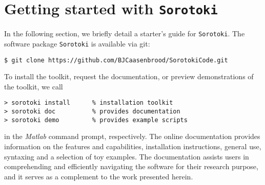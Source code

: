 \section{Getting started with \texttt{Sorotoki}}
\label{sec:C5:open_softrobots}
In the following section, we briefly detail a starter's guide for \texttt{Sorotoki}. The software package \texttt{Sorotoki} is available via git:
%
\begin{lstlisting}[style=terminal]
$ git clone https://github.com/BJCaasenbrood/SorotokiCode.git
\end{lstlisting}
%
To install the toolkit, request the documentation, or preview demonstrations of the toolkit, we call 
%
\begin{lstlisting}[style=Matlabterminal]
> sorotoki install      % installation toolkit
> sorotoki doc          % provides documentation
> sorotoki demo         % provides example scripts
\end{lstlisting}
%
in the \textit{Matlab} command prompt, respectively. The online documentation provides information on the features and capabilities, installation instructions, general use, syntaxing and a selection of toy examples. The documentation assists users in comprehending and efficiently navigating the software for their research purpose, and it serves as a complement to the work presented herein. 
